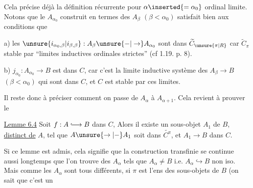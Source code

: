 Cela précise déjà la définition récurrente pour $\alpha\inserted{=\alpha_0}$ ordinal limite. Notons que le $A_{\alpha_0}$ construit en termes des $A_\beta$ $(\beta<\alpha_0)$ satisfait bien aux conditions que

a) les $\unsure{i_{\alpha_0,\beta}|i_{\beta,\beta}}:A_\beta\unsure{-|\to} A_{\alpha_0}$ sont dans $\widetilde C_{\unsure{\pi|R}}$  car $\widetilde C_\pi$ stable par ``limites inductives ordinales strictes'' (cf 1.19. p. 8).

b) $j_{\alpha_0}: A_{\alpha_0}\longrightarrow B$ est dans $C$, car c'est la limite inductive    système des $A_\beta\to B$ $(\beta<\alpha_0)$ qui sont dans $C$, et $C$ est stable par ces limites.

Il reste donc à préciser comment on passe de $A_\alpha$ à $A_{\alpha+1}$. Cela revient à prouver le

\uline{Lemme 6.4} Soit $f:A\lhook\joinrel\longrightarrow B$ dans $C$,  Alors il existe un sous-objet $A_1$ de $B$, \uline{distinct de} $A$, tel que $A\unsure{\to|-} A_1$ soit dans $\widetilde{C^\pi}$, et $A_1\to B$ dans $C$.

Si ce lemme est admis, cela signifie que la construction transfinie se continue aussi longtemps que l'on trouve des $A_\alpha$ tels que $A_\alpha\ne B$ i.e. $A_\alpha\hookrightarrow B$ non iso. Mais comme les $A_\alpha$ sont tous différents, si $\pi$ est l'ens des sous-objets de $B$ (on sait que c'est un
